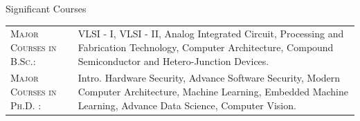 \begin{rSection}{Significant Courses}
\begin{tabular}{>{}l>{}p{13.8cm}} 
    \textsc{Major Courses in B.Sc.:}			&   VLSI - I, VLSI - II, Analog Integrated Circuit, Processing and Fabrication Technology, Computer Architecture, Compound Semiconductor and Hetero-Junction Devices.\\	
    \textsc{Major Courses in Ph.D. :}			&   Intro. Hardware Security, Advance Software Security, Modern Computer Architecture, Machine Learning, Embedded Machine Learning, Advance Data Science, Computer Vision.\\
\end{tabular}


\end{rSection} 